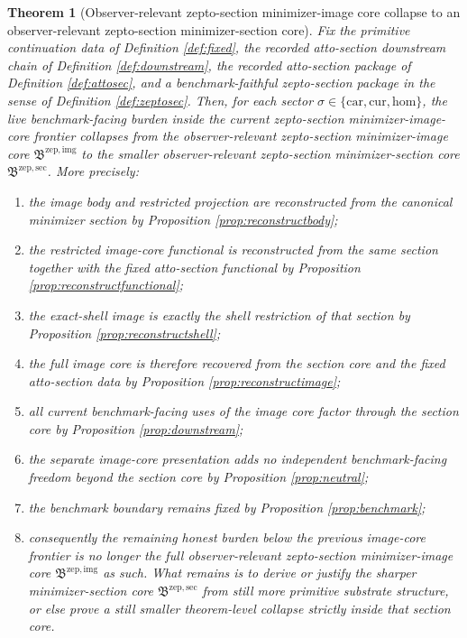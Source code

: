 \documentclass[11pt]{article}
\newcommand{\Car}{\mathrm{car}}
\newcommand{\Cur}{\mathrm{cur}}
\newcommand{\Hom}{\mathrm{hom}}
\newcommand{\ZeptoImageCore}{\mathfrak B^{\mathrm{zep,img}}}
\newcommand{\ZeptoMinSectionCore}{\mathfrak B^{\mathrm{zep,sec}}}
\newtheorem{theorem}{Theorem}
\begin{document}
\begin{theorem}[Observer-relevant zepto-section minimizer-image core collapse to an observer-relevant zepto-section minimizer-section core]
\label{thm:main}
Fix the primitive continuation data of Definition \ref{def:fixed}, the recorded atto-section downstream chain of Definition \ref{def:downstream}, the recorded atto-section package of Definition \ref{def:attosec}, and a benchmark-faithful zepto-section package in the sense of Definition \ref{def:zeptosec}. Then, for each sector \(\sigma\in\{\Car,\Cur,\Hom\}\), the live benchmark-facing burden inside the current zepto-section minimizer-image-core frontier collapses from the observer-relevant zepto-section minimizer-image core \(\ZeptoImageCore\) to the smaller observer-relevant zepto-section minimizer-section core \(\ZeptoMinSectionCore\). More precisely:
\begin{enumerate}
    \item the image body and restricted projection are reconstructed from the canonical minimizer section by Proposition \ref{prop:reconstructbody};
    \item the restricted image-core functional is reconstructed from the same section together with the fixed atto-section functional by Proposition \ref{prop:reconstructfunctional};
    \item the exact-shell image is exactly the shell restriction of that section by Proposition \ref{prop:reconstructshell};
    \item the full image core is therefore recovered from the section core and the fixed atto-section data by Proposition \ref{prop:reconstructimage};
    \item all current benchmark-facing uses of the image core factor through the section core by Proposition \ref{prop:downstream};
    \item the separate image-core presentation adds no independent benchmark-facing freedom beyond the section core by Proposition \ref{prop:neutral};
    \item the benchmark boundary remains fixed by Proposition \ref{prop:benchmark};
    \item consequently the remaining honest burden below the previous image-core frontier is no longer the full observer-relevant zepto-section minimizer-image core \(\ZeptoImageCore\) as such. What remains is to derive or justify the sharper minimizer-section core \(\ZeptoMinSectionCore\) from still more primitive substrate structure, or else prove a still smaller theorem-level collapse strictly inside that section core.
\end{enumerate}
\end{theorem}
\end{document}
